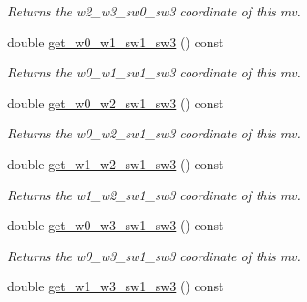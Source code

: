 \begin{DoxyCompactItemize}
\begin{DoxyCompactList}\small\item\em Returns the w2\-\_\-w3\-\_\-sw0\-\_\-sw3 coordinate of this mv. \end{DoxyCompactList}\item 
\hypertarget{classe3ga_1_1mv_a515f80a57cb34312cc52ead6933ee85b}{double \hyperlink{classe3ga_1_1mv_a515f80a57cb34312cc52ead6933ee85b}{get\-\_\-w0\-\_\-w1\-\_\-sw1\-\_\-sw3} () const }\label{classe3ga_1_1mv_a515f80a57cb34312cc52ead6933ee85b}

\begin{DoxyCompactList}\small\item\em Returns the w0\-\_\-w1\-\_\-sw1\-\_\-sw3 coordinate of this mv. \end{DoxyCompactList}\item 
\hypertarget{classe3ga_1_1mv_a086aa6ba08bf9be9fbe0def8049bf51c}{double \hyperlink{classe3ga_1_1mv_a086aa6ba08bf9be9fbe0def8049bf51c}{get\-\_\-w0\-\_\-w2\-\_\-sw1\-\_\-sw3} () const }\label{classe3ga_1_1mv_a086aa6ba08bf9be9fbe0def8049bf51c}

\begin{DoxyCompactList}\small\item\em Returns the w0\-\_\-w2\-\_\-sw1\-\_\-sw3 coordinate of this mv. \end{DoxyCompactList}\item 
\hypertarget{classe3ga_1_1mv_a36f070ba57078b5f2b45b8db80e71b30}{double \hyperlink{classe3ga_1_1mv_a36f070ba57078b5f2b45b8db80e71b30}{get\-\_\-w1\-\_\-w2\-\_\-sw1\-\_\-sw3} () const }\label{classe3ga_1_1mv_a36f070ba57078b5f2b45b8db80e71b30}

\begin{DoxyCompactList}\small\item\em Returns the w1\-\_\-w2\-\_\-sw1\-\_\-sw3 coordinate of this mv. \end{DoxyCompactList}\item 
\hypertarget{classe3ga_1_1mv_ad497a24d390f8b1243a15105c702a01b}{double \hyperlink{classe3ga_1_1mv_ad497a24d390f8b1243a15105c702a01b}{get\-\_\-w0\-\_\-w3\-\_\-sw1\-\_\-sw3} () const }\label{classe3ga_1_1mv_ad497a24d390f8b1243a15105c702a01b}

\begin{DoxyCompactList}\small\item\em Returns the w0\-\_\-w3\-\_\-sw1\-\_\-sw3 coordinate of this mv. \end{DoxyCompactList}\item 
\hypertarget{classe3ga_1_1mv_a224db863f65387a37f0959e4fe60bc57}{double \hyperlink{classe3ga_1_1mv_a224db863f65387a37f0959e4fe60bc57}{get\-\_\-w1\-\_\-w3\-\_\-sw1\-\_\-sw3} () const }\label{classe3ga_1_1mv_a224db863f65387a37f0959e4fe60bc57}


\end{DoxyCompactItemize}
